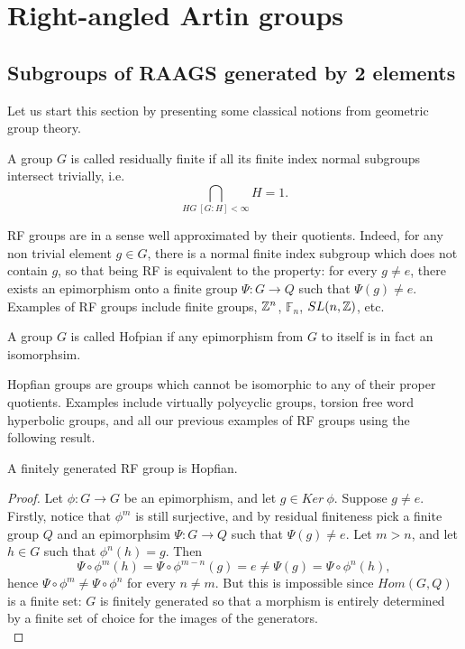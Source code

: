 \newpage

\section{Right-angled Artin groups}

\subsection{Subgroups of RAAGS generated by 2 elements}

Let us start this section by presenting some classical notions from geometric group theory.

\begin{definition}
A group $G$ is called residually finite if all its finite index normal subgroups intersect trivially, i.e.
\[\bigcap_{H G \ [G:H] < \infty} H = 1.\]
\end{definition}

RF groups are in a sense well approximated by their quotients. Indeed, for any non trivial element $g\in G$, there is a normal finite index subgroup which does not contain $g$, so that being RF is equivalent to the property: for every $g\neq e$, there exists an epimorphism onto a finite group $\Psi: G \rightarrow Q$ such that $\Psi(g)\neq e$.\\

Examples of RF groups include finite groups, $\mathbb Z^n$, $\mathbb F_n$, $SL(n,\mathbb Z)$, etc.

\begin{definition}
A group $G$ is called Hofpian if any epimorphism from $G$ to itself is in fact an isomorphsim.
\end{definition}

Hopfian groups are groups which cannot be isomorphic to any of their proper quotients. Examples include virtually polycyclic groups, torsion free word hyperbolic groups, and all our previous examples of RF groups using the following result.

\begin{prop}
A finitely generated RF group is Hopfian.
\end{prop}

\begin{proof}
Let $\phi: G \rightarrow G$ be an epimorphism, and let $g\in Ker \ \phi$. Suppose $g\neq e$. Firstly, notice that $\phi^m$ is still surjective, and by residual finiteness pick a finite group $Q$ and an epimorphsim $\Psi : G\rightarrow Q$ such that $\Psi(g)\neq e$. Let $m>n$, and let $h\in G$ such that $\phi^n(h)=g$. Then
\[ \Psi\circ\phi^m(h)=\Psi\circ\phi^{m-n}(g) = e\neq \Psi(g)=\Psi\circ\phi^n(h),\]
hence $\Psi\circ\phi^m\neq \Psi\circ\phi^n$ for every $n\neq m$. But this is impossible since $Hom(G,Q)$ is a finite set: $G$ is finitely generated so that a morphism is entirely determined by a finite set of choice for the images of the generators.\\ 
\end{proof}


